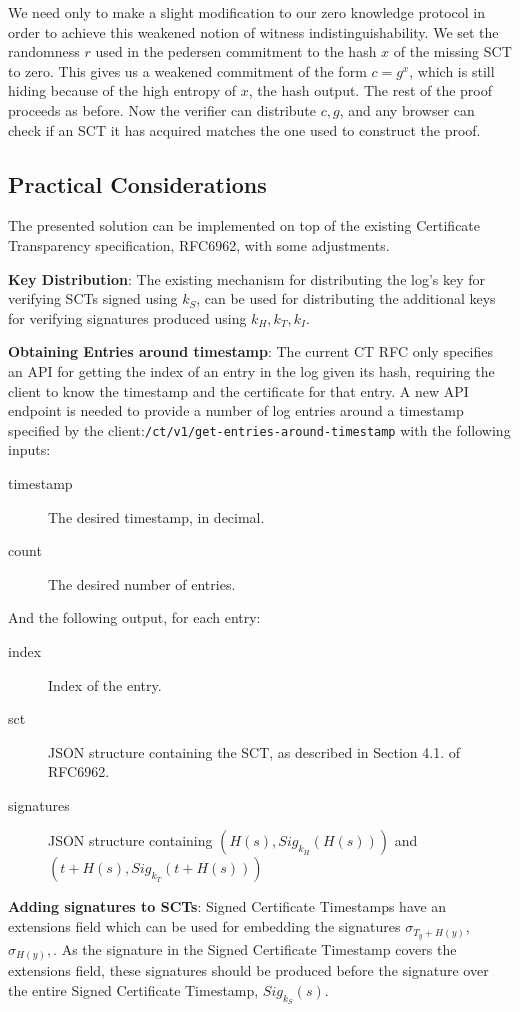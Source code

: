 \documentclass[letterpaper,twocolumn,10pt]{article}
\begin{document}
We need only to make a slight modification to our zero knowledge protocol in order to achieve this weakened notion of witness indistinguishability. We set the randomness $r$ used in the pedersen commitment to the  hash $x$ of the missing SCT to zero. This gives us a weakened commitment of the form $c=g^x$, which is still hiding because of the high entropy of $x$, the hash output. The rest of the proof proceeds as before. Now the verifier can distribute $c,g$, and any browser can check if an SCT it has acquired matches the one used to construct the proof. 

\subsection{Practical Considerations}

The presented solution can be implemented on top of the existing Certificate Transparency specification, RFC6962, with some adjustments.

\textbf{Key Distribution}: The existing mechanism for distributing the log's key for verifying SCTs signed using $k_S$, can be used for distributing the additional keys for verifying signatures produced using $k_H, k_T, k_I$.

\textbf{Obtaining Entries around timestamp}: The current CT RFC only specifies an API for getting the index of an entry in the log given its hash, requiring the client to know the timestamp and the certificate for that entry. A new API endpoint is needed to provide a number of log entries around a timestamp specified by the client:\texttt{/ct/v1/get-entries-around-timestamp} with the following inputs:
\begin{description}
  \item[timestamp] The desired timestamp, in decimal.
  \item[count] The desired number of entries.
\end{description}
And the following output, for each entry:
\begin{description}
  \item[index] Index of the entry.
  \item[sct] JSON structure containing the SCT, as described in Section 4.1. of RFC6962.
  \item[signatures] JSON structure containing $(H(s), Sig_{k_H}(H(s)))$ and $(t+H(s), Sig_{k_T}(t+H(s)))$
\end{description}

\textbf{Adding signatures to SCTs}: Signed Certificate Timestamps have an extensions field which can be used for embedding the signatures $\sigma_{T_y+H(y)},$ $\sigma_{H(y)}, $. As the signature in the Signed Certificate Timestamp covers the extensions field, these signatures should be produced before the signature over the entire Signed Certificate Timestamp, $Sig_{k_S}(s)$.
\end{document}
